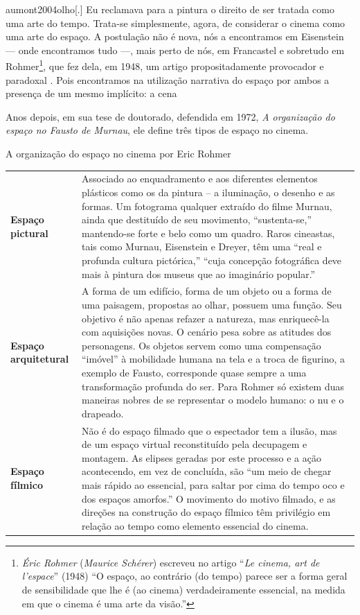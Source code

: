\begin{displaycquote}[141]{aumont2004olho}[.]
	Eu reclamava para a pintura o direito de ser tratada como uma arte do
	tempo. Trata-se simplesmente, agora, de considerar o cinema como uma
	arte do espaço. A postulação não é nova, nós a encontramos em Eisenstein
	--- onde encontramos tudo ---, mais perto de nós, em Francastel e sobretudo
	em Rohmer\footnote{\emph{Éric Rohmer} (\emph{Maurice Schérer}) escreveu
		no artigo \enquote{\emph{Le cinema, art de l'espace}} (1948) \enquote{O espaço, ao
			contrário (do tempo) parece ser a forma geral de sensibilidade que lhe
			é (ao cinema) verdadeiramente essencial, na medida em que o cinema é
			uma arte da visão.}}, que fez dela, em 1948, um artigo
	propositadamente provocador e paradoxal \textelp{}. Pois encontramos na
	utilização narrativa do espaço por ambos \textelp{} a presença de um mesmo
	implícito: a cena
\end{displaycquote}

Anos depois, em sua tese de doutorado, defendida em 1972, \emph{A
	organização do espaço no Fausto de Murnau}, ele define três tipos de
espaço no cinema.

\begin{quadro}[h]
	\caption{A organização do espaço no cinema por Eric Rohmer}

	\begin{tabular}{lm{.7\linewidth}}
		\toprule
		\textbf{Espaço pictural}     & Associado ao enquadramento e aos diferentes
		elementos plásticos como os da pintura -- a iluminação, o desenho e as
		formas. Um fotograma qualquer extraído do filme Murnau, ainda que
		destituído de seu movimento, \enquote{sustenta-se,} mantendo-se forte e belo
		como um quadro. Raros cineastas, tais como Murnau, Eisenstein e Dreyer,
		têm uma \enquote{real e profunda cultura pictórica,} \enquote{cuja concepção
			fotográfica deve mais à pintura dos museus que ao imaginário
			popular.}\tabularnewline
		\addlinespace
		\textbf{Espaço arquitetural} & A forma de um edifício, forma de um
		objeto ou a forma de uma paisagem, propostas ao olhar, possuem uma
		função. Seu objetivo é não apenas refazer a natureza, mas enriquecê-la
		com aquisições novas. O cenário pesa sobre as atitudes dos personagens.
		Os objetos servem como uma compensação \enquote{imóvel} à mobilidade humana na
		tela e a troca de figurino, a exemplo de Fausto, corresponde quase
		sempre a uma transformação profunda do ser. Para Rohmer só existem duas
		maneiras nobres de se representar o modelo humano: o nu e o
		drapeado.\tabularnewline
		\addlinespace
		\textbf{Espaço fílmico}      & Não é do espaço filmado que o espectador tem a
		ilusão, mas de um espaço virtual reconstituído pela decupagem e
		montagem. As elipses geradas por este processo e a ação acontecendo, em
		vez de concluída, são \enquote{um meio de chegar mais rápido ao essencial, para
			saltar por cima do tempo oco e dos espaços amorfos.} O movimento do
		motivo filmado, e as direções na construção do espaço fílmico têm
		privilégio em relação ao tempo como elemento essencial do
		cinema.\tabularnewline
		\bottomrule
	\end{tabular}
\end{quadro}

